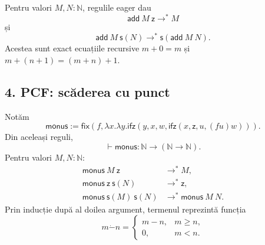 Pentru valori $M,N:\mathbb N$, regulile eager dau
\[
	\mathsf{add}\ M\ \mathsf z\to^* M
\]
și
\[
	\mathsf{add}\ M\ \mathsf{s}(N)
	\to^*\mathsf{s}(\mathsf{add}\ M\ N).
\]
Acestea sunt exact ecuațiile recursive
$m+0=m$ și $m+(n+1)=(m+n)+1$.

\subsection*{4. PCF: scăderea cu punct}

Notăm
\[
	\mathsf{monus}:=
	\mathsf{fix}(f,\lambda x.\lambda y.
	\mathsf{ifz}(y,x,w,\mathsf{ifz}(x,\mathsf z,u,(fu)w))).
\]
Din aceleași reguli,
\[
	\vdash\mathsf{monus}:\mathbb N\to(\mathbb N\to\mathbb N).
\]
Pentru valori $M,N:\mathbb N$:
\[
	\begin{aligned}
		\mathsf{monus}\ M\ \mathsf z
		&\to^* M,\\
		\mathsf{monus}\ \mathsf z\ \mathsf{s}(N)
		&\to^*\mathsf z,\\
		\mathsf{monus}\ \mathsf{s}(M)\ \mathsf{s}(N)
		&\to^*\mathsf{monus}\ M\ N.
	\end{aligned}
\]
Prin inducție după al doilea argument, termenul reprezintă funcția
\[
	m\mathbin{\dot{-}}n=
	\begin{cases}
		m-n,&m\geq n,\\
		0,&m<n.
	\end{cases}
\]

